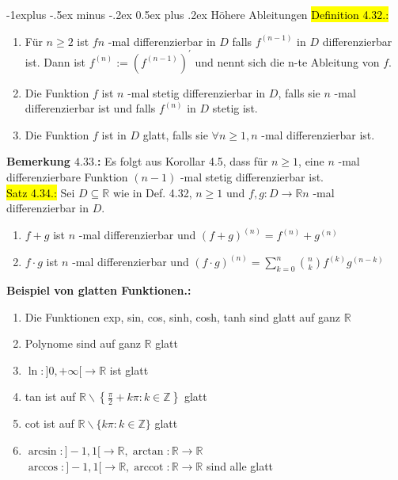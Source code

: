 \documentclass[10pt,landscape]{article}
\makeatletter
\newcommand{\yellow}[1]{\sethlcolor{yellow} \hl{#1}}
\newcommand{\blue}[1]{\sethlcolor{cyan} \hl{#1}}
\renewcommand{\subsection}{\@startsection{subsection}{2}{0mm}%
                                {-1explus -.5ex minus -.2ex}%
                                {0.5ex plus .2ex}%
                                {\normalfont\normalsize\bfseries}}
\makeatother
\begin{document}
\begin{multicols}{3}
\subsection{Höhere Ableitungen}
\blue{Definition 4.32.:}
\begin{enumerate}
        \item Für $n \geq 2$ ist $f n$ -mal differenzierbar in $D$ falls $f^{(n-1)}$ in $D$ differenzierbar ist. 
        Dann ist $f^{(n)}:=\left(f^{(n-1)}\right)^{\prime}$ und nennt sich die n-te Ableitung von $f$.
        \item Die Funktion $f$ ist $n$ -mal stetig differenzierbar in $D$, falls sie $n$ -mal differenzierbar ist und falls $f^{(n)}$ in $D$ stetig ist.
        \item Die Funktion $f$ ist in $D$ glatt, falls sie $\forall n \geq 1, n$ -mal differenzierbar ist.
\end{enumerate}
\textbf{Bemerkung $4.33.$:} Es folgt aus Korollar 4.5, dass für $n \geq 1$, 
eine $n$ -mal differenzierbare Funktion $(n-1)$ -mal stetig differenzierbar ist.\\
\yellow{Satz 4.34.:} Sei $D \subseteq \mathbb{R}$ wie in Def. 4.32, $n \geq 1$ 
und $f, g: D \longrightarrow \mathbb{R} n$ -mal differenzierbar in $D$.
\begin{enumerate}
        \item $f+g$ ist $n$ -mal differenzierbar und
        $(f+g)^{(n)}=f^{(n)}+g^{(n)}$
        \item $f \cdot g$ ist $n$ -mal differenzierbar und
        $(f \cdot g)^{(n)}=\sum_{k=0}^{n}\binom{n}{k} f^{(k)} g^{(n-k)}$
\end{enumerate}
\textbf{Beispiel von glatten Funktionen.:}
\begin{enumerate}
        \item  Die Funktionen exp, sin, cos, sinh, cosh, tanh sind glatt auf ganz $\mathbb{R}$
        \item Polynome sind auf ganz $\mathbb{R}$ glatt
        \item $\ln :] 0,+\infty[\longrightarrow \mathbb{R}$ ist glatt
        \item tan ist auf $\mathbb{R} \backslash\left\{\frac{\pi}{2}+k \pi: k \in \mathbb{Z}\right\}$ glatt
        \item cot ist auf $\mathbb{R} \backslash\{k \pi: k \in \mathbb{Z}\}$ glatt
        \item $\arcsin :]-1,1[\longrightarrow \mathbb{R}, \arctan : \mathbb{R} \longrightarrow \mathbb{R}$\\
        $\arccos :]-1,1[\longrightarrow \mathbb{R},\operatorname{arccot}: \mathbb{R} \longrightarrow \mathbb{R}$ sind alle glatt

\end{enumerate}
\end{multicols}
\end{document}
